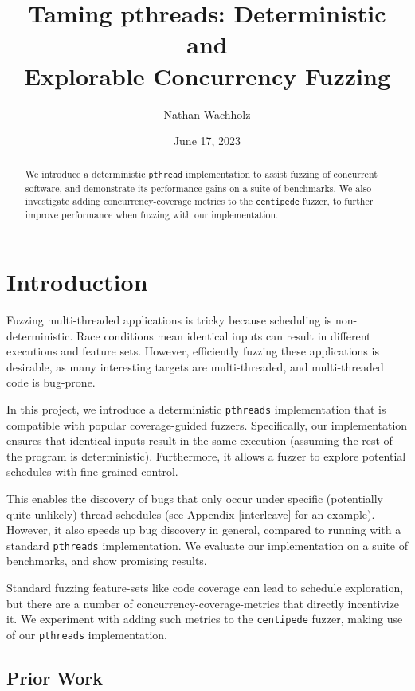 \documentclass{article}
\title{\vspace{-2.5cm}Taming pthreads: Deterministic and\\Explorable Concurrency Fuzzing}
\author{Nathan Wachholz}
\date{June 17, 2023}
\begin{document}
\maketitle

\begin{abstract}
    \noindent We introduce a deterministic \texttt{pthread} implementation to assist fuzzing of concurrent software, and demonstrate its performance gains on a suite of benchmarks. We also investigate adding concurrency-coverage metrics to the \texttt{centipede} fuzzer, to further improve performance when fuzzing with our implementation.
\end{abstract}

\section{Introduction}

\sloppy
Fuzzing multi-threaded applications is tricky because scheduling is non-deterministic. Race conditions mean identical inputs can result in different executions and feature sets. However, efficiently fuzzing these applications is desirable, as many interesting targets are multi-threaded, and multi-threaded code is bug-prone.

\fussy

In this project, we introduce a deterministic \texttt{pthreads} implementation that is compatible with popular coverage-guided fuzzers. Specifically, our implementation\cite{my_unthread} ensures that identical inputs result in the same execution (assuming the rest of the program is deterministic). Furthermore, it allows a fuzzer to explore potential schedules with fine-grained control.

This enables the discovery of bugs that only occur under specific (potentially quite unlikely) thread schedules (see Appendix \ref{interleave} for an example). However, it also speeds up bug discovery in general, compared to running with a standard \texttt{pthreads} implementation. We evaluate our implementation on a suite of benchmarks, and show promising results.

Standard fuzzing feature-sets like code coverage can lead to schedule exploration, but there are a number of concurrency-coverage-metrics that directly incentivize it. We experiment with adding such metrics to the \texttt{centipede} fuzzer, making use of our \texttt{pthreads} implementation.

\subsection{Prior Work}
\end{document}
